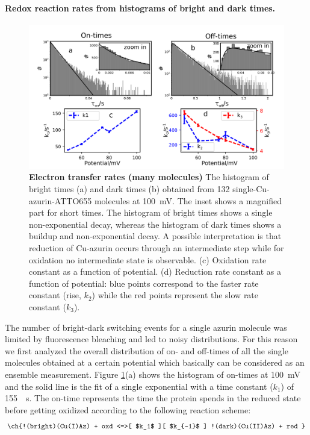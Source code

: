 \documentclass[journal=jacsat,manuscript=article]{achemso}
\begin{document}
\paragraph*{Redox reaction rates from histograms of bright and dark times.}
\begin{figure}
	\centering
	\includegraphics[width=\textwidth]{many_sm_hist}
	\caption{\textbf{Electron transfer rates (many molecules)} The histogram of bright times (a) and dark times (b) obtained from 132 single-Cu-azurin-ATTO655 molecules at \SI{100}{\mV}. The inset shows a magnified part for short times.
	The histogram of bright times shows a single non-exponential decay, whereas the histogram of dark times shows a buildup and non-exponential decay. A possible interpretation is that reduction of Cu-azurin occurs through an intermediate step while for oxidation no intermediate state is observable.
	(c) Oxidation rate constant as a function of potential. 
	(d) Reduction rate constant as a function of potential: blue points correspond to the faster rate constant (rise, $k_2$) while the red points represent the slow rate constant ($k_3$).}
	\label{fig:many_sm_hist}
\end{figure}
The number of bright-dark switching events for a single azurin molecule was limited by fluorescence bleaching and led to noisy distributions.
For this reason we first analyzed the overall distribution of on- and off-times of all the single molecules obtained at a certain potential which basically can be considered as an ensemble measurement.
Figure \ref{fig:many_sm_hist}(a) shows the histogram of on-times at \SI{100}{\mV} and the solid line is the fit of a single exponential with a time constant ($k_{1}$) of \SI{155}{\per\s}.
The on-time represents the time the protein spends in the reduced state before getting oxidized according to the following reaction scheme:
\begin{align}
	\ch{!(bright)(Cu(I)Az) + oxd <=>[ $k_1$ ][ $k_{-1}$ ] !(dark)(Cu(II)Az) + red }
	\label{eq:oxidation}
\end{align}
\end{document}
